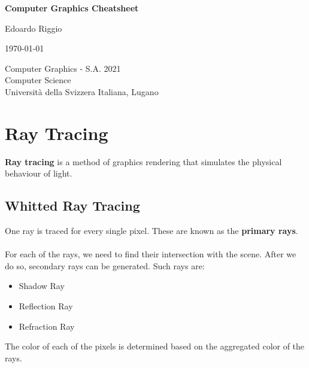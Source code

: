 \documentclass{article}
\begin{document}
\begin{titlepage}
    \begin{center}
        \vspace*{1cm}
        
        \Huge
        \textbf{Computer Graphics Cheatsheet}
        
        \vspace{0.5cm}
        \LARGE
        
        \vspace{.5cm}
        
        Edoardo Riggio
   		  \vspace{1.5cm}
       
        \vfill
        
        \today
        
        \vspace{.8cm}
          \Large
          Computer Graphics - S.A. 2021 \\
        Computer Science\\
        Universit\`{a} della Svizzera Italiana, Lugano\\
        
    \end{center}
\end{titlepage}

\tableofcontents

\newpage

\section{Ray Tracing}
\textbf{Ray tracing} is a method of graphics rendering that simulates the physical behaviour of light.

\subsection{Whitted Ray Tracing}
One ray is traced for every single pixel. These are known as the \textbf{primary rays}. \\ \\
For each of the rays, we need to find their intersection with the scene. After we do so, secondary rays can be generated. Such rays are:

\begin{itemize}
	\item Shadow Ray
	\item Reflection Ray
	\item Refraction Ray
\end{itemize}
The color of each of the pixels is determined based on the aggregated color of the rays.
\end{document}
